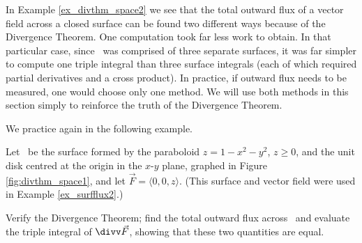 In Example \ref{ex_divthm_space2} we see that the total outward flux of a vector field across a closed surface can be found two different ways because of the Divergence Theorem. One computation took far less work to obtain. In that particular case, since \surfaceS\ was comprised of three separate surfaces, it was far simpler to compute one triple integral than three surface integrals (each of which required partial derivatives and a cross product). In practice, if outward flux needs to be measured, one would choose only one method. We will use both methods in this section simply to reinforce the truth of the Divergence Theorem.

We practice again in the following example.\\
\enlargethispage{2\baselineskip}

{Let \surfaceS\ be the surface formed by the paraboloid $z=1-x^2-y^2$, $z\geq 0$, and the unit disk centred at the origin in the $x$-$y$ plane, graphed in Figure \ref{fig:divthm_space1}, and let $\vec F = \langle 0,0,z\rangle$. (This surface and vector field were used in Example \ref{ex_surfflux2}.)


Verify the Divergence Theorem; find the total outward flux across \surfaceS\ and evaluate the triple integral of $\divv \vec F$, showing that these two quantities are equal.
}
